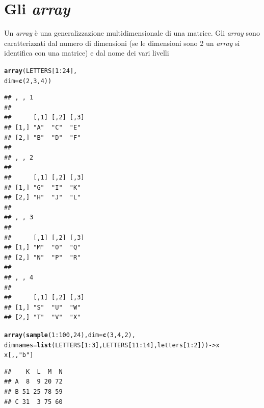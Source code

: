 \documentclass[onecolumn,12pt]{book}\usepackage[]{graphicx}\usepackage[]{color}
\makeatletter
\newcommand{\hlnum}[1]{\textcolor[rgb]{0.686,0.059,0.569}{#1}}%
\newcommand{\hlstr}[1]{\textcolor[rgb]{0.192,0.494,0.8}{#1}}%
\newcommand{\hlopt}[1]{\textcolor[rgb]{0,0,0}{#1}}%
\newcommand{\hlstd}[1]{\textcolor[rgb]{0.345,0.345,0.345}{#1}}%
\newcommand{\hlkwb}[1]{\textcolor[rgb]{0.69,0.353,0.396}{#1}}%
\newcommand{\hlkwc}[1]{\textcolor[rgb]{0.333,0.667,0.333}{#1}}%
\newcommand{\hlkwd}[1]{\textcolor[rgb]{0.737,0.353,0.396}{\textbf{#1}}}%
\newenvironment{kframe}{%
 \def\at@end@of@kframe{}%
 \ifinner\ifhmode%
  \def\at@end@of@kframe{\end{minipage}}%
  \begin{minipage}{\columnwidth}%
 \fi\fi%
 \def\FrameCommand##1{\hskip\@totalleftmargin \hskip-\fboxsep
 \colorbox{shadecolor}{##1}\hskip-\fboxsep
     \hskip-\linewidth \hskip-\@totalleftmargin \hskip\columnwidth}%
 \MakeFramed {\advance\hsize-\width
   \@totalleftmargin\z@ \linewidth\hsize
   \@setminipage}}%
 {\par\unskip\endMakeFramed%
 \at@end@of@kframe}
\newenvironment{knitrout}{}{} %
\makeatother
\begin{document}
\section{Gli \emph{array}}
Un \emph{array}  \`e una generalizzazione multidimensionale di una matrice. Gli \emph{array} sono caratterizzati dal numero di dimensioni  (se le dimensioni sono 2 un \emph{array} si identifica con una  matrice) e dal nome dei vari livelli
\begin{knitrout}
\color{fgcolor}\begin{kframe}
\begin{alltt}
\hlkwd{array}\hlstd{(LETTERS[}\hlnum{1}\hlopt{:}\hlnum{24}\hlstd{],}
\hlkwc{dim}\hlstd{=}\hlkwd{c}\hlstd{(}\hlnum{2}\hlstd{,}\hlnum{3}\hlstd{,}\hlnum{4}\hlstd{))}
\end{alltt}
\begin{verbatim}
## , , 1
## 
##      [,1] [,2] [,3]
## [1,] "A"  "C"  "E" 
## [2,] "B"  "D"  "F" 
## 
## , , 2
## 
##      [,1] [,2] [,3]
## [1,] "G"  "I"  "K" 
## [2,] "H"  "J"  "L" 
## 
## , , 3
## 
##      [,1] [,2] [,3]
## [1,] "M"  "O"  "Q" 
## [2,] "N"  "P"  "R" 
## 
## , , 4
## 
##      [,1] [,2] [,3]
## [1,] "S"  "U"  "W" 
## [2,] "T"  "V"  "X"
\end{verbatim}
\begin{alltt}
\hlkwd{array}\hlstd{(}\hlkwd{sample}\hlstd{(}\hlnum{1}\hlopt{:}\hlnum{100}\hlstd{,}\hlnum{24}\hlstd{),} \hlkwc{dim}\hlstd{=}\hlkwd{c}\hlstd{(}\hlnum{3}\hlstd{,}\hlnum{4}\hlstd{,}\hlnum{2}\hlstd{),}
      \hlkwc{dimnames}\hlstd{=}\hlkwd{list}\hlstd{(LETTERS[}\hlnum{1}\hlopt{:}\hlnum{3}\hlstd{],LETTERS[}\hlnum{11}\hlopt{:}\hlnum{14}\hlstd{],letters[}\hlnum{1}\hlopt{:}\hlnum{2}\hlstd{]))}\hlkwb{->}\hlstd{x}
\hlstd{x[,,}\hlstr{"b"}\hlstd{]}
\end{alltt}
\begin{verbatim}
##    K  L  M  N
## A  8  9 20 72
## B 51 25 78 59
## C 31  3 75 60
\end{verbatim}
\end{kframe}
\end{knitrout}
\end{document}
